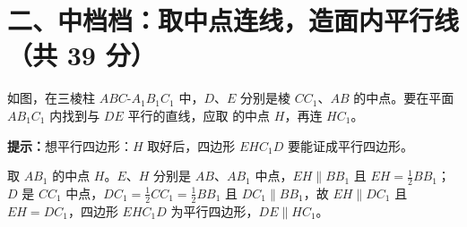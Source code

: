 \documentclass{exam-zh}
\begin{document}
\clearpage
\section*{二、中档档：取中点连线，造面内平行线（共 39 分）}


\begin{question}[points=7]
  \noindent
  \begin{minipage}[t]{\dimexpr\linewidth-60mm-6mm\relax}
    \vspace{0pt}
    如图，在三棱柱 $ABC$-$A_{1}B_{1}C_{1}$ 中，$D$、$E$ 分别是棱 $CC_{1}$、$AB$ 的中点。要在平面 $AB_{1}C_{1}$ 内找到与 $DE$ 平行的直线，应取 \underline{\hspace{3em}} 的中点 $H$，再连 $HC_{1}$。
    \begin{hintbox}
\textbf{提示：}想平行四边形：$H$ 取好后，四边形 $EHC_{1}D$ 要能证成平行四边形。\end{hintbox}

  \end{minipage}\hfill
  \begin{diagramcoltikz}{60mm}{三棱柱中 $D$、$E$ 为中点，构造平行四边形 $EHC_{1}D$。}
  }
  \end{diagramcoltikz}
  \paren[$AB_{1}$]
  \begin{solutionblock}
    取 $AB_{1}$ 的中点 $H$。$E$、$H$ 分别是 $AB$、$AB_{1}$ 中点，$EH\parallel BB_{1}$ 且 $EH=\tfrac12 BB_{1}$；$D$ 是 $CC_{1}$ 中点，$DC_{1}=\tfrac12 CC_{1}=\tfrac12 BB_{1}$ 且 $DC_{1}\parallel BB_{1}$，故 $EH\parallel DC_{1}$ 且 $EH=DC_{1}$，四边形 $EHC_{1}D$ 为平行四边形，$DE\parallel HC_{1}$。
  \end{solutionblock}
\end{question}



\end{document}
